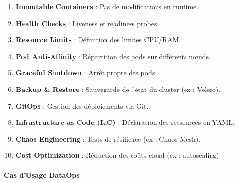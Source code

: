 \documentclass[
  letterpaper,
  DIV=11,
  numbers=noendperiod]{scrartcl}
\makeatletter
\let\oldparagraph\paragraph
\renewcommand{\paragraph}{
    \@ifstar
      \xxxParagraphStar
      \xxxParagraphNoStar
  }
\newcommand{\xxxParagraphStar}[1]{\oldparagraph*{#1}\mbox{}}
\newcommand{\xxxParagraphNoStar}[1]{\oldparagraph{#1}\mbox{}}
\providecommand{\tightlist}{%
  \setlength{\itemsep}{0pt}\setlength{\parskip}{0pt}}\usepackage{longtable,booktabs,array}
\makeatother
\begin{document}
\begin{enumerate}
\def\labelenumi{\arabic{enumi}.}
\setcounter{enumi}{80}
\tightlist
\item
  \textbf{Immutable Containers} : Pas de modifications en runtime.\\
\item
  \textbf{Health Checks} : Liveness et readiness probes.\\
\item
  \textbf{Resource Limits} : Définition des limites CPU/RAM.\\
\item
  \textbf{Pod Anti-Affinity} : Répartition des pods sur différents
  nœuds.\\
\item
  \textbf{Graceful Shutdown} : Arrêt propre des pods.\\
\item
  \textbf{Backup \& Restore} : Sauvegarde de l'état du cluster (ex :
  Velero).\\
\item
  \textbf{GitOps} : Gestion des déploiements via Git.\\
\item
  \textbf{Infrastructure as Code (IaC)} : Déclaration des ressources en
  YAML.\\
\item
  \textbf{Chaos Engineering} : Tests de résilience (ex : Chaos Mesh).\\
\item
  \textbf{Cost Optimization} : Réduction des coûts cloud (ex :
  autoscaling).
\end{enumerate}

\paragraph{\texorpdfstring{\textbf{Cas d'Usage
DataOps}}{Cas d'Usage DataOps}}\label{cas-dusage-dataops}
\end{document}

